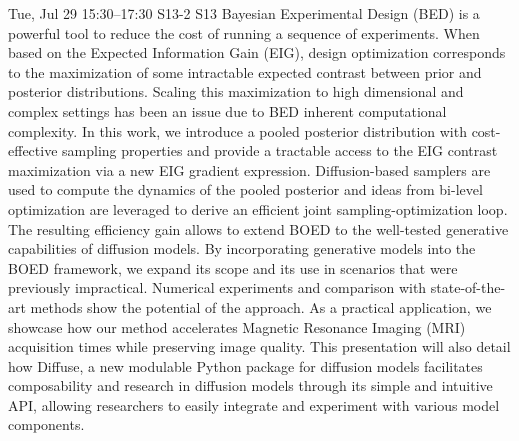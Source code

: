 \begin{talk}
  {}%
  {}%
  {}%
  {}%
  {}%
  {}%
  {Tue, Jul 29 15:30–17:30}%
  {S13-2}%
  {S13}%
    Bayesian  Experimental Design (BED) is a powerful tool to reduce the cost of running a sequence of experiments.
    When based on the Expected Information Gain (EIG), design optimization corresponds to the maximization of some intractable expected  contrast between prior and posterior distributions.
    Scaling this maximization to high dimensional and complex settings has been an issue due to BED inherent computational complexity.
    In this work, we introduce a pooled posterior distribution with cost-effective sampling properties and provide a tractable access to the EIG contrast maximization via a new EIG gradient expression. Diffusion-based samplers are used to compute the dynamics of the pooled posterior and ideas from bi-level optimization are leveraged to derive an efficient joint sampling-optimization loop.
    The resulting efficiency gain allows to extend BOED to the well-tested generative capabilities of diffusion models.
    By incorporating generative models into the BOED framework, we expand its scope and its use in scenarios that were previously impractical. Numerical experiments and comparison with state-of-the-art methods show the potential of the approach.
    As a practical application, we showcase how our method accelerates Magnetic Resonance Imaging (MRI) acquisition times while preserving image quality.
    This presentation will also detail how Diffuse, a new modulable Python package for diffusion models facilitates composability and research in diffusion models through its simple and intuitive API, allowing researchers to easily integrate and experiment with various model components.

\end{talk}

